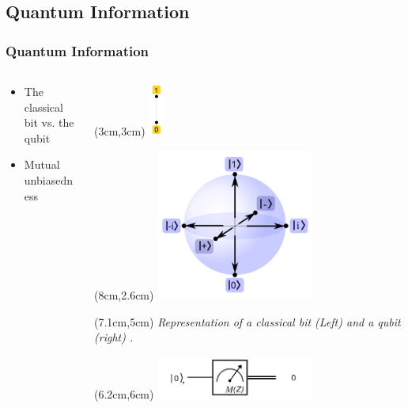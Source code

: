 \documentclass[]{beamer}
\begin{document}
\subsection{Quantum Information}

\begin{frame}
	\frametitle{Quantum Information}
	\begin{columns}
		\begin{column}{0.5\textwidth}
		\begin{itemize}
			\item The classical bit vs. the qubit
			\vspace{2cm}
			\item Mutual unbiasedness
		\end{itemize}
		\end{column}
		\begin{column}{0.5\textwidth}  %
			\begin{center}
				\begin{textblock*}{10cm}(3cm,3cm)
				\includegraphics[width=0.05\textwidth]{ClassicalBit.png}
				\end{textblock*}
				\begin{textblock*}{5cm}(8cm,2.6cm)
				\includegraphics[width=0.5\textwidth]{QuantumBit.png}
				\end{textblock*}
				\begin{textblock*}{5cm}(7.1cm,5cm)
				\tiny	\textit{Representation of a classical bit (Left) and a qubit (right) \cite{Pomorski2018}.}
				\end{textblock*}
				\begin{textblock*}{7cm}(6.2cm,6cm)
					\includegraphics[width=0.5\textwidth]{MeasureInZ.png}

\end{textblock*}
\end{center}
\end{column}
\end{columns}
\end{frame}
\end{document}
